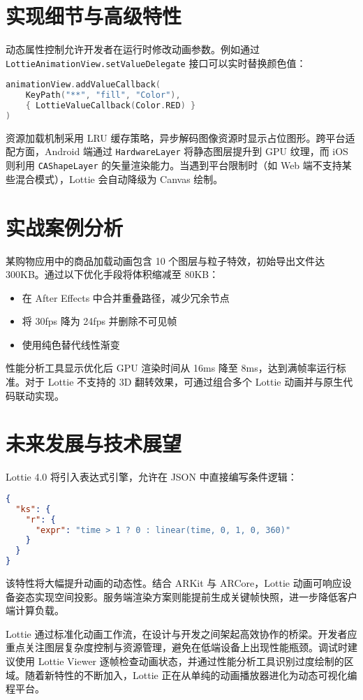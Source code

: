 \chapter{实现细节与高级特性}
动态属性控制允许开发者在运行时修改动画参数。例如通过 \verb!LottieAnimationView.setValueDelegate! 接口可以实时替换颜色值：\par
\begin{lstlisting}[language=kotlin]
animationView.addValueCallback(
    KeyPath("**", "fill", "Color"), 
    { LottieValueCallback(Color.RED) }
)
\end{lstlisting}
资源加载机制采用 LRU 缓存策略，异步解码图像资源时显示占位图形。跨平台适配方面，Android 端通过 \verb!HardwareLayer! 将静态图层提升到 GPU 纹理，而 iOS 则利用 \verb!CAShapeLayer! 的矢量渲染能力。当遇到平台限制时（如 Web 端不支持某些混合模式），Lottie 会自动降级为 Canvas 绘制。\par
\chapter{实战案例分析}
某购物应用中的商品加载动画包含 10 个图层与粒子特效，初始导出文件达 300KB。通过以下优化手段将体积缩减至 80KB：\par
\begin{itemize}
\item 在 After Effects 中合并重叠路径，减少冗余节点
\item 将 30fps 降为 24fps 并删除不可见帧
\item 使用纯色替代线性渐变
\end{itemize}
性能分析工具显示优化后 GPU 渲染时间从 16ms 降至 8ms，达到满帧率运行标准。对于 Lottie 不支持的 3D 翻转效果，可通过组合多个 Lottie 动画并与原生代码联动实现。\par
\chapter{未来发展与技术展望}
Lottie 4.0 将引入表达式引擎，允许在 JSON 中直接编写条件逻辑：\par
\begin{lstlisting}[language=json]
{
  "ks": {
    "r": {
      "expr": "time > 1 ? 0 : linear(time, 0, 1, 0, 360)"
    }
  }
}
\end{lstlisting}
该特性将大幅提升动画的动态性。结合 ARKit 与 ARCore，Lottie 动画可响应设备姿态实现空间投影。服务端渲染方案则能提前生成关键帧快照，进一步降低客户端计算负载。\par
Lottie 通过标准化动画工作流，在设计与开发之间架起高效协作的桥梁。开发者应重点关注图层复杂度控制与资源管理，避免在低端设备上出现性能瓶颈。调试时建议使用 Lottie Viewer 逐帧检查动画状态，并通过性能分析工具识别过度绘制的区域。随着新特性的不断加入，Lottie 正在从单纯的动画播放器进化为动态可视化编程平台。\par
